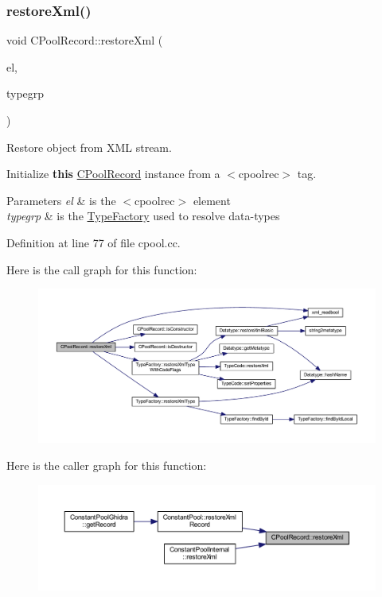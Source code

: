 \subsubsection{\texorpdfstring{restoreXml()}{restoreXml()}}
{\footnotesize\ttfamily void C\+Pool\+Record\+::restore\+Xml (\begin{DoxyParamCaption}\item[{const \mbox{\hyperlink{class_element}{Element}} $\ast$}]{el,  }\item[{\mbox{\hyperlink{class_type_factory}{Type\+Factory}} \&}]{typegrp }\end{DoxyParamCaption})}



Restore object from X\+ML stream. 

Initialize {\bfseries{this}} \mbox{\hyperlink{class_c_pool_record}{C\+Pool\+Record}} instance from a $<$cpoolrec$>$ tag. 
\begin{DoxyParams}{Parameters}
{\em el} & is the $<$cpoolrec$>$ element \\
\hline
{\em typegrp} & is the \mbox{\hyperlink{class_type_factory}{Type\+Factory}} used to resolve data-\/types \\
\hline
\end{DoxyParams}


Definition at line 77 of file cpool.\+cc.

Here is the call graph for this function\+:
\nopagebreak
\begin{figure}[H]
\begin{center}
\leavevmode
\includegraphics[width=350pt]{class_c_pool_record_a93e21b4afa8d1db68152b7d6e56c3413_cgraph}
\end{center}
\end{figure}
Here is the caller graph for this function\+:
\nopagebreak
\begin{figure}[H]
\begin{center}
\leavevmode
\includegraphics[width=350pt]{class_c_pool_record_a93e21b4afa8d1db68152b7d6e56c3413_icgraph}
\end{center}
\end{figure}
\mbox{\label{class_c_pool_record_a3c44a419dc5e21167354c715fadcfa18}} 

